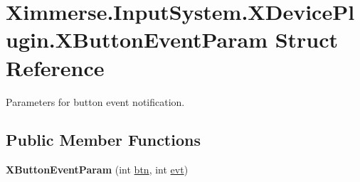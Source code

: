 \hypertarget{struct_ximmerse_1_1_input_system_1_1_x_device_plugin_1_1_x_button_event_param}{}\section{Ximmerse.\+Input\+System.\+X\+Device\+Plugin.\+X\+Button\+Event\+Param Struct Reference}
\label{struct_ximmerse_1_1_input_system_1_1_x_device_plugin_1_1_x_button_event_param}


Parameters for button event notification.  


\subsection*{Public Member Functions}
\begin{DoxyCompactItemize}
\item 
\mbox{\label{struct_ximmerse_1_1_input_system_1_1_x_device_plugin_1_1_x_button_event_param_abd19c2270bf1a7fc8738ba2c4448e19e}} 
{\bfseries X\+Button\+Event\+Param} (int \mbox{\hyperlink{struct_ximmerse_1_1_input_system_1_1_x_device_plugin_1_1_x_button_event_param_a2b9f845a00595703ede0cf328f5c84a2}{btn}}, int \mbox{\hyperlink{struct_ximmerse_1_1_input_system_1_1_x_device_plugin_1_1_x_button_event_param_a1884c4954136a72ff657fe35c4f0e43b}{evt}})
\end{DoxyCompactItemize}
